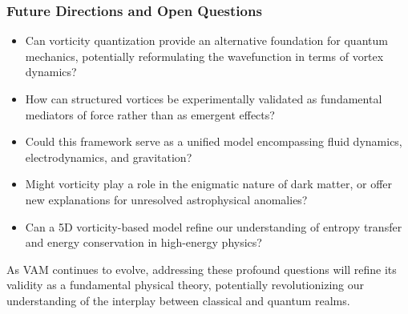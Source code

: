 \subsubsection*{Future Directions and Open Questions}
\begin{itemize}
    \item Can vorticity quantization provide an alternative foundation for quantum mechanics, potentially reformulating the wavefunction in terms of vortex dynamics?
    \item How can structured vortices be experimentally validated as fundamental mediators of force rather than as emergent effects?
    \item Could this framework serve as a unified model encompassing fluid dynamics, electrodynamics, and gravitation?
    \item Might vorticity play a role in the enigmatic nature of dark matter, or offer new explanations for unresolved astrophysical anomalies?
    \item Can a 5D vorticity-based model refine our understanding of entropy transfer and energy conservation in high-energy physics?
\end{itemize}

As VAM continues to evolve, addressing these profound questions will refine its validity as a fundamental physical theory, potentially revolutionizing our understanding of the interplay between classical and quantum realms.